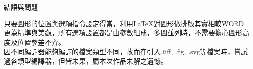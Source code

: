

\newpage
\centerline{{\BCF 結語與問題}}
\setlength{\parindent}{2em} 
	只要圖形的位置與選項指令設定得當，利用\LaTeX 對圖形做排版其實相較WORD更為精準與美觀，所有選項設置都是由參數組成，多圖並列時，不需要擔心圖形高度及位置參差不齊。\\
	\indent 因不同編譯器能夠編譯的檔案類型不同，故而在引入.tiff, .fig, .svg等檔案時，嘗試過各類型編譯器，但皆未果，屬本次作品未解之遺憾。
	

\newpage
\nocite{*}











